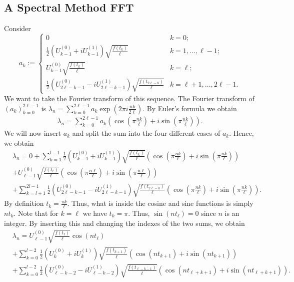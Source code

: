 \documentclass{article}
\begin{document}
\subsection{A Spectral Method FFT}
Consider 
\[
a_k := \begin{cases}
0 & k = 0; \\
\frac{1}{2} \left( U^{(0)}_{k-1} + i U^{(1)}_{k-1} \right) \sqrt{\frac{f(t_k)}{\ell}} & k = 1, \dots, \ell - 1; \\
U^{(0)}_{k-1} \sqrt{\frac{f(t_k)}{\ell}} & k = \ell; \\
\frac{1}{2} \left( U^{(0)}_{2\ell - k - 1} - i U^{(1)}_{2\ell - k - 1} \right) \sqrt{\frac{f(t_{2\ell - k})}{\ell}} & k = \ell + 1, \dots, 2\ell - 1.
\end{cases}
\]
We want to take the Fourier transform of this sequence. The Fourier transform of $(a_k)_{k=0}^{2\ell-1}$ is $\lambda_n = \sum_{k=0}^{2\ell-1} a_k \exp(2\pi i \frac{nk}{2\ell})$. By Euler's formula we obtain
\begin{align*}
\lambda_n = \sum_{k=0}^{2\ell-1} a_k \left( \cos\left(\pi\frac{nk}{\ell}\right) + i\sin\left(\pi \frac{nk}{\ell}\right)\right).
\end{align*}
We will now insert $a_k$ and split the sum into the four different cases of $a_k$. Hence, we obtain
\begin{align*}
&\lambda_n = 0 + \sum_{k=1}^{l-1} \frac{1}{2} \left( U^{(0)}_{k-1} + i U^{(1)}_{k-1} \right) \sqrt{\frac{f(t_k)}{\ell}} \left( \cos\left(\pi\frac{nk}{\ell}\right) + i\sin\left(\pi \frac{nk}{\ell}\right)\right)\\
&+ U^{(0)}_{\ell-1} \sqrt{\frac{f(t_\ell)}{\ell}}\left( \cos\left(\pi\frac{n\ell}{\ell}\right) + i\sin\left(\pi \frac{n\ell}{\ell}\right)\right)\\
&+ \sum_{k=l+1}^{2l-1} \frac{1}{2} \left( U^{(0)}_{2\ell - k - 1} - i U^{(1)}_{2\ell - k - 1} \right) \sqrt{\frac{f(t_{2\ell - k})}{\ell}}\left( \cos\left(\pi\frac{nk}{\ell}\right) + i\sin\left(\pi \frac{nk}{\ell}\right)\right).
\end{align*}
By definition $t_k=\frac{\pi k}{\ell}$. Thus, what is inside the cosine and sine functions is simply $nt_k$. Note that for $k=\ell$ we have $t_k=\pi$. Thus, $\sin(nt_\ell)=0$ since $n$ is an integer. By inserting this and changing the indexes of the two sums, we obtain
\begin{align*}
&\lambda_n = U^{(0)}_{\ell-1} \sqrt{\frac{f(t_\ell)}{\ell}}\cos(nt_\ell)\\
& + \sum_{k=0}^{l-2} \frac{1}{2} \left( U^{(0)}_{k}+ i U^{(1)}_{k} \right) \sqrt{\frac{f(t_{k+1})}{\ell}} \left( \cos\left(n t_{k+1}\right) + i\sin\left(n t_{k+1}\right)\right)\\
&+ \sum_{k=0}^{l-2}\frac{1}{2} \left( U^{(0)}_{\ell-k-2}- i U^{(1)}_{\ell-k-2} \right) \sqrt{\frac{f(t_{\ell-k-1})}{\ell}} \left( \cos\left(n t_{\ell+k+1}\right) + i\sin\left(n t_{\ell+k+1}\right)\right).
\end{align*}
\end{document}
